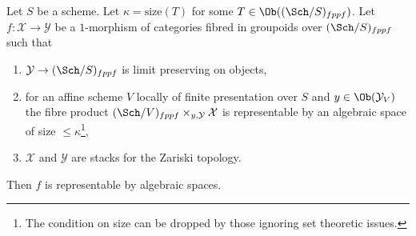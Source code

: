 \begin{lemma}
\label{lemma-check-representable-limit-preserving}
Let $S$ be a scheme.
Let $\kappa = \text{size}(T)$ for some $T \in \Ob((\Sch/S)_{fppf})$.
Let $f : \mathcal{X} \to \mathcal{Y}$ be a $1$-morphism
of categories fibred in groupoids over $(\Sch/S)_{fppf}$
such that
\begin{enumerate}
\item $\mathcal{Y} \to (\Sch/S)_{fppf}$ is limit preserving on objects,
\item for an affine scheme $V$ locally of finite presentation over $S$ and
$y \in \Ob(\mathcal{Y}_V)$ the fibre product
$(\Sch/V)_{fppf} \times_{y, \mathcal{Y}} \mathcal{X}$ is representable
by an algebraic space of size $\leq \kappa$\footnote{The condition on
size can be dropped by those ignoring set theoretic issues.},
\item $\mathcal{X}$ and $\mathcal{Y}$ are stacks for the Zariski topology.
\end{enumerate}
Then $f$ is representable by algebraic spaces.
\end{lemma}

